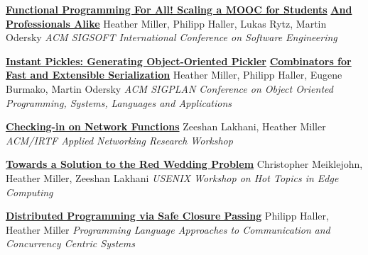 \documentclass[9pt]{article}
\begin{document}
\noindent\href{http://infoscience.epfl.ch/record/190022}{\bf Functional Programming For All! Scaling a MOOC for Students}\vspace{-0.03in}
\newline\noindent\href{http://infoscience.epfl.ch/record/190022}{\bf And Professionals Alike}
\newline\noindent Heather Miller, Philipp Haller, Lukas Rytz, Martin Odersky
\newline\noindent\emph{ACM SIGSOFT International Conference on Software Engineering}
\bigskip

\noindent\href{http://infoscience.epfl.ch/record/188383}{\bf Instant Pickles: Generating Object-Oriented Pickler}\vspace{-0.03in}
\newline\noindent\href{http://infoscience.epfl.ch/record/188383}{\bf Combinators for Fast and Extensible Serialization}
\newline\noindent Heather Miller, Philipp Haller, Eugene Burmako, Martin Odersky
\newline\noindent\emph{ACM SIGPLAN Conference on Object Oriented Programming, Systems,}
\newline\noindent\emph{Languages and Applications}
\bigskip

\pagebreak

\noindent\href{https://dl.acm.org/citation.cfm?id=3341131}{\bf Checking-in on Network Functions}
\newline\noindent Zeeshan Lakhani, Heather Miller
\newline\noindent\emph{ACM/IRTF Applied Networking Research Workshop}
\bigskip

\noindent\href{https://www.usenix.org/system/files/conference/hotedge18/hotedge18-papers-meiklejohn.pdf}{\bf Towards a Solution to the Red Wedding Problem}
\newline\noindent Christopher Meiklejohn, Heather Miller, Zeeshan Lakhani
\newline\noindent\emph{USENIX Workshop on Hot Topics in Edge Computing}
\bigskip

\noindent\href{https://infoscience.epfl.ch/record/205039}{\bf Distributed Programming via Safe Closure Passing}
\newline\noindent Philipp Haller, Heather Miller
\newline\noindent\emph{Programming Language Approaches to Communication}
\newline\noindent\emph{and Concurrency Centric Systems}
\bigskip
\end{document}
